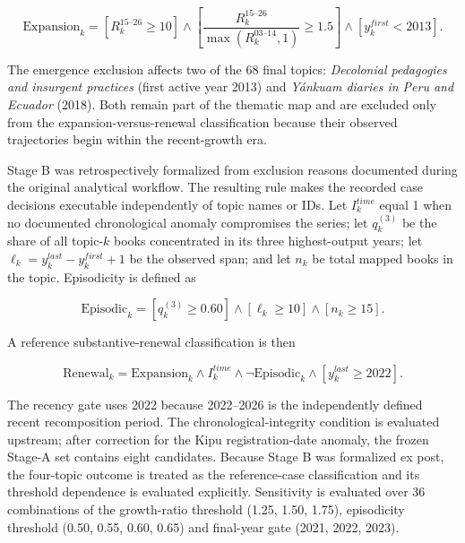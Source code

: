 \documentclass[futureinternet,article,submit,moreauthors]{Definitions/mdpi}
\begin{document}
\begin{equation}
\mathrm{Expansion}_k = [R^{15\text{--}26}_k\ge 10]
\land \left[\frac{R^{15\text{--}26}_k}{\max(R^{03\text{--}14}_k,1)}\ge 1.5\right]
\land [y^{first}_k<2013].
\label{eq:stageA}
\end{equation}

The emergence exclusion affects two of the 68 final topics: \emph{Decolonial pedagogies and insurgent practices} (first active year 2013) and \emph{Yánkuam diaries in Peru and Ecuador} (2018). Both remain part of the thematic map and are excluded only from the expansion-versus-renewal classification because their observed trajectories begin within the recent-growth era.

Stage B was retrospectively formalized from exclusion reasons documented during the original analytical workflow. The resulting rule makes the recorded case decisions executable independently of topic names or IDs. Let $I^{time}_k$ equal 1 when no documented chronological anomaly compromises the series; let $q^{(3)}_k$ be the share of all topic-$k$ books concentrated in its three highest-output years; let $\ell_k=y^{last}_k-y^{first}_k+1$ be the observed span; and let $n_k$ be total mapped books in the topic. Episodicity is defined as

\begin{equation}
\mathrm{Episodic}_k=[q^{(3)}_k\ge0.60]\land[\ell_k\ge10]\land[n_k\ge15].
\label{eq:episodic}
\end{equation}

A reference substantive-renewal classification is then

\begin{equation}
\mathrm{Renewal}_k=\mathrm{Expansion}_k\land I^{time}_k
\land\neg\mathrm{Episodic}_k\land[y^{last}_k\ge2022].
\label{eq:stageB}
\end{equation}

The recency gate uses 2022 because 2022--2026 is the independently defined recent recomposition period. The chronological-integrity condition is evaluated upstream; after correction for the Kipu registration-date anomaly, the frozen Stage-A set contains eight candidates. Because Stage B was formalized ex post, the four-topic outcome is treated as the reference-case classification and its threshold dependence is evaluated explicitly. Sensitivity is evaluated over 36 combinations of the growth-ratio threshold (1.25, 1.50, 1.75), episodicity threshold (0.50, 0.55, 0.60, 0.65) and final-year gate (2021, 2022, 2023).
\end{document}
